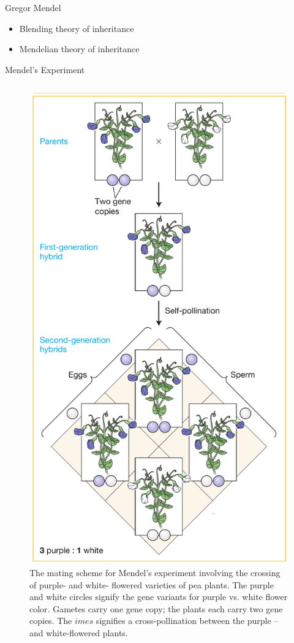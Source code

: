\documentclass[11pt,ignorenonframetext,aspectratio=169]{beamer}
\providecommand{\tightlist}{%
  \setlength{\itemsep}{0pt}\setlength{\parskip}{0pt}}
\begin{document}
\begin{frame}{Gregor Mendel}
\protect\hypertarget{gregor-mendel}{}
\begin{itemize}
\tightlist
\item
  Blending theory of inheritance
\item
  Mendelian theory of inheritance
\end{itemize}
\end{frame}

\begin{frame}{Mendel's Experiment}
\protect\hypertarget{mendels-experiment}{}
\begin{columns}[T,onlytextwidth]
  

\begin{figure}
\includegraphics[width=0.35\linewidth]{../images/mendels_experiment} \caption{The mating scheme for Mendel’s experiment involving the crossing of purple- and white- flowered varieties of pea plants. The purple and white circles signify the gene variants for purple vs. white flower color. Gametes carry one gene copy; the plants each carry two gene copies. The $  imes$ signifies a cross-pollination between the purple -- and white-flowered plants.}\label{fig:mendels-experiment}
\end{figure}
  


\end{columns}
\end{frame}
\end{document}
